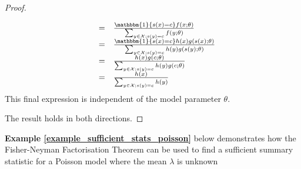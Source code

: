 \documentclass[11pt,a4paper]{article}
\newcommand*{\indexed}{\mathbbm{1}}
\theoremstyle{break}
\begin{document}
\begin{box_theorem}
\begin{proof}
\begin{itemize}
\[\begin{array}{rcl}
          &=&\frac{\indexed\{s(x)=c\}f(x;\theta)}{\sum_{y\in\mathcal{X};s(y)=c}f(y;\theta)}\\
          &=&\frac{\indexed\{s(x)=c\}h(x)g(s(x);\theta)}{\sum_{y\in\mathcal{X};s(y)=c}h(y)g(s(y);\theta)}\\
          &=&\frac{h(x)g(c;\theta)}{\sum_{y\in\mathcal{X};s(y)=c}h(y)g(c;\theta)}\\
          &=&\frac{h(x)}{\sum_{y\in\mathcal{X};s(y)=c}h(y)}
        \end{array}\]
        This final expression is independent of the model parameter $\theta$.
      \end{itemize}
      The result holds in both directions.
    \end{proof}
  \end{box_theorem}

  \par \textbf{Example \ref{example_sufficient_stats_poisson}} below demonstrates how the Fisher-Neyman Factorisation Theorem can be used to find a sufficient summary statistic for a Poisson model where the mean $\lambda$ is unknown
\end{document}
